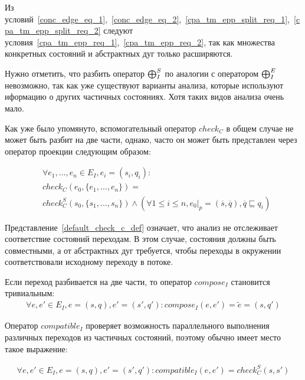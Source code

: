 Из условий~\ref{conc_edge_eq_1},~\ref{conc_edge_eq_2},~\ref{cpa_tm_epp_split_req_1},~\ref{cpa_tm_epp_split_req_2} следуют условия~\ref{cpa_tm_epp_req_1},~\ref{cpa_tm_epp_req_2}, так как множества конкретных состояний и абстрактных дуг только расширяются.

Нужно отметить, что разбить оператор $\mathrel{\bigoplus}^S_I$ по аналогии с оператором $\mathrel{\bigoplus}^E_I$ невозможно, так как уже существуют варианты анализа, которые используют иформацию о других частичных состояниях. 
Хотя таких видов анализа очень мало. 

Как уже было упомянуто, вспомогательный оператор $check_C$ в общем случае не может быть разбит на две части, однако, часто он может быть представлен через оператор проекции следующим образом: 

\begin{equation}
\label{default_check_c_def}
\begin{aligned}
& \forall e_1, \dots, e_n \in E_I, e_i=(s_i,q_i): \\
& check_C(e_0, \{e_1, \dots, e_n\}) = \\
& check^S_C(s_0, \{s_1, \dots, s_n\}) \land (\forall 1 \le i \le n, e_0|_p = (\overline{s}, \overline{q}), \overline{q} \sqsubseteq q_i)
\end{aligned}
\end{equation}

Представление~\ref{default_check_c_def} означает, что анализ не отслеживает соответствие состояний переходам. 
В этом случае, состояния должны быть совместными, а от абстрактных дуг требуется, чтобы переходы в окружении соответствовали исходному переходу в потоке. 

Если переход разбивается на две части, то оператор $compose_I$ становится тривиальным:
\begin{equation}
\label{default_compose_def}
\begin{aligned}
\forall e, e' \in E_I, e = (s, q), e' = (s', q'): compose_I(e, e') = \tilde{e} = (s, q')
\end{aligned}
\end{equation}

Оператор $compatible_I$ проверяет возможность параллельного выполнения различных переходов из частичных состояний, поэтому обычно имеет место такое выражение:

\begin{equation}
\label{default_compatible_def}
\begin{aligned}
\forall e, e' \in E_I, e = (s, q), e' = (s', q'): compatible_I(e, e') = check^S_C(s, {s'})
\end{aligned}
\end{equation}


